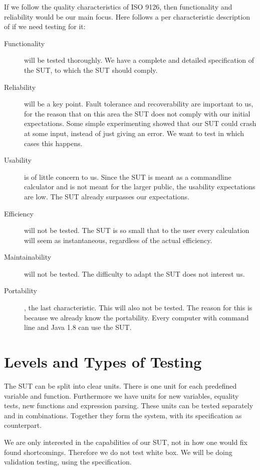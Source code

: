 \documentclass[11pt,a4paper]{article}
\begin{document}
If we follow the quality characteristics of ISO 9126, then functionality and reliability would be our main focus. Here follows a per characteristic description of if we need testing for it:
\begin{description}
	\item[Functionality] will be tested thoroughly. We have a complete and detailed specification of the SUT, to which the SUT should comply.
	\item[Reliability] will be a key point. Fault tolerance and recoverability are important to us, for the reason that on this area the SUT does not comply with our initial expectations. Some simple experimenting showed that our SUT could crash at some input, instead of just giving an error. We want to test in which cases this happens.
	\item[Usability] is of little concern to us. Since the SUT is meant as a commandline calculator and is not meant for the larger public, the usability expectations are low. The SUT already surpasses our expectations.
	\item[Efficiency] will not be tested. The SUT is so small that to the user every calculation will seem as instantaneous, regardless of the actual efficiency.
	\item[Maintainability] will not be tested. The difficulty to adapt the SUT does not interest us.
	\item[Portability], the last characteristic. This will also not be tested. The reason for this is because we already know the portability. Every computer with command line and Java 1.8 can use the SUT.
\end{description}

\section{Levels and Types of Testing} \label{levels}

The SUT can be split into clear units. There is one unit for each predefined variable and function. Furthermore we have units for new variables, equality tests, new functions and expression parsing. These units can be tested separately and in combinations. Together they form the system, with its specification as counterpart.

\fi




We are only interested in the capabilities of our SUT, not in how one would fix found shortcomings. Therefore we do not test white box. We will be doing validation testing, using the specification.
\end{document}
